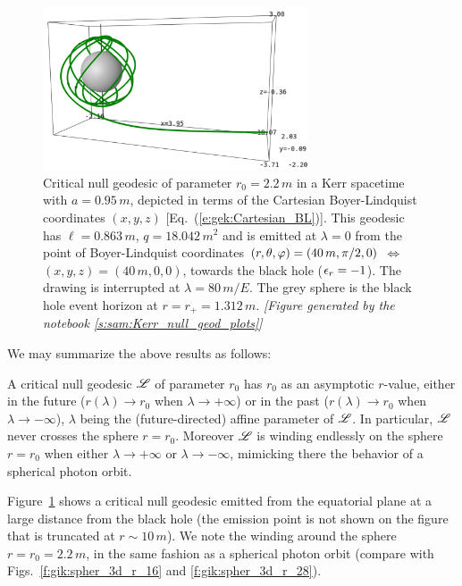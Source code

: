 \begin{figure}
\centerline{\includegraphics[width=0.7\textwidth]{gik_critical_geod.png}}
\caption[]{\label{f:gik:gik_critical_geod} \footnotesize
Critical null geodesic of parameter $r_0=2.2\, m$ in a Kerr spacetime
with $a=0.95\, m$, depicted in terms of the  Cartesian Boyer-Lindquist coordinates
$(x,y,z)$ [Eq.~(\ref{e:gek:Cartesian_BL})]. This geodesic has $\ell = 0.863\, m$,
$q = 18.042\, m^2$ and is emitted at $\lambda=0$
from the point of Boyer-Lindquist coordinates $(r,\theta,\varphi) = (40\, m, \pi/2, 0)$
$\iff$ $(x,y,z) = (40\, m, 0, 0)$,
towards the black hole ($\epsilon_r = -1$). The drawing is interrupted at
$\lambda=80\, m/E$. The grey sphere is the black hole event horizon at
$r = r_+ = 1.312\, m$.
\textsl{[Figure generated by the notebook \ref{s:sam:Kerr_null_geod_plots}]}
}
\end{figure}

We may summarize the above results as follows:
\begin{prop}
A critical null geodesic $\mathscr{L}$ of parameter $r_0$ has $r_0$ as an asymptotic $r$-value,
either in the future ($r(\lambda) \to r_0$ when $\lambda\to +\infty$) or in the
past ($r(\lambda) \to r_0$ when $\lambda\to -\infty$), $\lambda$ being the (future-directed) affine
parameter of $\mathscr{L}$. In particular, $\mathscr{L}$ never crosses the sphere $r=r_0$.
Moreover $\mathscr{L}$ is winding endlessly on the sphere $r=r_0$ when
either $\lambda\to+\infty$ or $\lambda\to-\infty$, mimicking there the behavior of
a spherical photon orbit.
\end{prop}



\begin{example} \label{x:gik:critical_geod}
Figure~\ref{f:gik:gik_critical_geod} shows a critical null geodesic
emitted from the equatorial plane at a large distance from the black hole
(the emission point is not shown on the figure that is truncated
at $r\sim 10\, m$). We note the winding around the sphere $r=r_0 = 2.2\, m$,
in the same fashion as a spherical photon orbit (compare with Figs.~\ref{f:gik:spher_3d_r_16}
and \ref{f:gik:spher_3d_r_28}).
\end{example}

